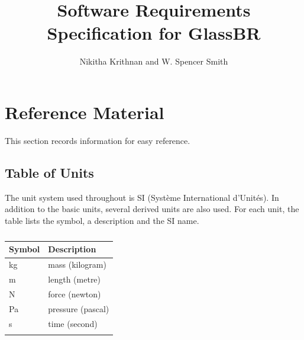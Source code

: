 \documentclass[12pt]{article}
\title{Software Requirements Specification for GlassBR}
\author{Nikitha Krithnan and W. Spencer Smith}
\begin{document}
\maketitle
\tableofcontents
\newpage
\section{Reference Material}
\label{Sec:RefMat}
This section records information for easy reference.
\subsection{Table of Units}
\label{Sec:ToU}
The unit system used throughout is SI (Système International d'Unités). In addition to the basic units, several derived units are also used. For each unit, the table lists the symbol, a description and the SI name.
\begin{longtable}{l l}
\toprule
Symbol & Description
\\
\midrule
\endhead
kg & mass (kilogram)
\\
m & length (metre)
\\
N & force (newton)
\\
Pa & pressure (pascal)
\\
s & time (second)
\\
\bottomrule
\caption{}
\label{Table:ToU}
\end{longtable}
\end{document}
